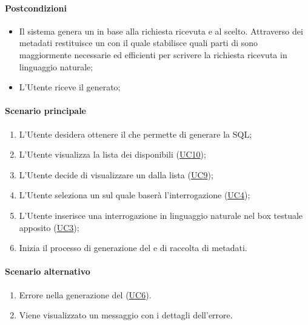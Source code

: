 \paragraph*{Postcondizioni}
\begin{itemize}
  \item Il sistema genera un  in base alla richiesta ricevuta e al  scelto. Attraverso dei metadati restituisce un  con il quale stabilisce quali parti di  sono maggiormente necessarie ed efficienti per scrivere la richiesta ricevuta in linguaggio naturale;
  \item L’Utente riceve il  generato;
\end{itemize}

\paragraph*{Scenario principale}
\begin{enumerate}
  \item L’Utente desidera ottenere il  che permette di generare la  SQL;
  \item L'Utente visualizza la lista dei  disponibili (\hyperref[UC10]{UC10});
  \item L'Utente decide di visualizzare un  dalla lista (\hyperref[UC9]{UC9});
  \item L’Utente seleziona un  sul quale baserà l’interrogazione (\hyperref[UC4]{UC4});
  \item L’Utente inserisce una interrogazione in linguaggio naturale nel box testuale apposito (\hyperref[UC3]{UC3});
  \item Inizia il processo di generazione del  e di raccolta di metadati.
\end{enumerate}

\paragraph*{Scenario alternativo}
\begin{enumerate}
  \item Errore nella generazione del  (\hyperref[UC6]{UC6}).
  \item Viene visualizzato un messaggio con i dettagli dell'errore.
\end{enumerate}

